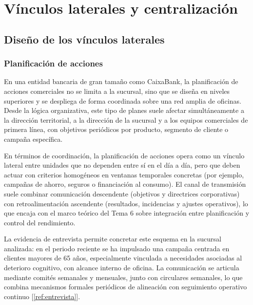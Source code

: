 
\chapter{Vínculos laterales y centralización}

\section{Diseño de los vínculos laterales}

\subsection{Planificación de acciones}


En una entidad bancaria de gran tamaño como CaixaBank, la planificación de acciones
comerciales no se limita a la sucursal, sino que se diseña en niveles superiores y
se despliega de forma coordinada sobre una red amplia de oficinas. Desde la lógica
organizativa, este tipo de planes suele afectar simultáneamente a la dirección
territorial, a la dirección de la sucursal y a los equipos comerciales de primera
línea, con objetivos periódicos por producto, segmento de cliente o campaña
específica.

En términos de coordinación, la planificación de acciones opera como un vínculo
lateral entre unidades que no dependen entre sí en el día a día, pero que deben
actuar con criterios homogéneos en ventanas temporales concretas (por ejemplo,
campañas de ahorro, seguros o financiación al consumo). El canal de transmisión
suele combinar comunicación descendente (objetivos y directrices corporativas) con
retroalimentación ascendente (resultados, incidencias y ajustes operativos), lo que
encaja con el marco teórico del Tema 6 sobre integración entre planificación y
control del rendimiento.

La evidencia de entrevista permite concretar este esquema en la sucursal analizada:
en el periodo reciente se ha impulsado una campaña centrada en clientes mayores de
65 años, especialmente vinculada a necesidades asociadas al deterioro cognitivo,
con alcance interno de oficina. La comunicación se articula mediante comités
semanales y mensuales, junto con circulares semanales, lo que combina mecanismos
formales periódicos de alineación con seguimiento operativo continuo [\ref{ref:entrevista}].

